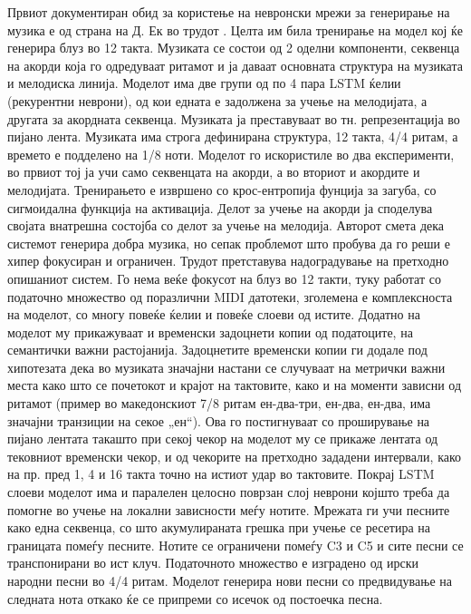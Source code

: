 Првиот документиран обид за користење на невронски мрежи за генерирање на музика е од страна на Д. Ек во трудот \cite{Eck2002}. Целта им била тренирање на модел кој ќе генерира блуз во 12 такта. Музиката се состои од 2 оделни компоненти, секвенца на акорди која го одредуваат ритамот и ја даваат основната структура на музиката и мелодиска линија. Моделот има две групи од по 4 пара LSTM ќелии (рекурентни неврони), од кои едната е задолжена за учење на мелодијата, а другата за акордната секвенца. Музиката ја преставуваат во тн. репрезентација во пијано лента. Музиката има строга дефинирана структура, 12 такта, 4/4 ритам, а времето е подделено на 1/8 ноти. Моделот го искористиле во два експерименти, во првиот тој ја учи само секвенцата на акорди, а во вториот и акордите и мелодијата. Тренирањето е извршено со крос-ентропија фунција за загуба, со сигмоидална функција на активација. Делот за учење на акорди ја споделува својата внатрешна состојба со делот за учење на мелодија. Авторот смета дека системот генерира добра музика, но сепак проблемот што пробува да го реши е хипер фокусиран и ограничен. Трудот \cite{Eck2008} претставува надоградување на претходно опишаниот систем. Го нема веќе фокусот на блуз во 12 такти, туку работат со податочно множество од поразлични MIDI датотеки, зголемена е комплексноста на моделот, со многу повеќе ќелии и повеќе слоеви од истите. Додатно на моделот му прикажуваат и временски задоцнети копии од податоците, на семантички важни растојанија. Задоцнетите временски копии ги додале под хипотезата дека во музиката значајни настани се случуваат на метрички важни места како што се почетокот и крајот на тактовите, како и на моменти зависни од ритамот (пример во македонскиот 7/8 ритам ен-два-три, ен-два, ен-два, има значајни транзиции на секое „ен“). Ова го постигнуваат со проширување на пијано лентата такашто при секој чекор на моделот му се прикаже лентата од тековниот временски чекор, и од чекорите на претходно зададени интервали, како на пр. пред 1, 4 и 16 такта точно на истиот удар во тактовите. Покрај LSTM слоеви моделот има и паралелен целосно поврзан слој неврони којшто треба да помогне во учење на локални зависности меѓу нотите. Мрежата ги учи песните како една секвенца, со што акумулираната грешка при учење се ресетира на границата помеѓу песните. Нотите се ограничени помеѓу C3 и C5 и сите песни се транспонирани во ист клуч. Податочното множество е изградено од  ирски народни песни во 4/4 ритам. Моделот генерира нови песни со предвидување на следната нота откако ќе се припреми со исечок од постоечка песна.

